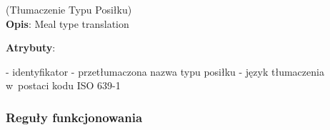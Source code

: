 \begin{enumerate}[label={\textbf{KAT/3/\protect\twodigits{\theenumi}}}, wide, labelwidth=!, labelindent=0pt, labelsep=0pt, series=reqs]
    \label{kat:MealTypeTranslation} (Tłumaczenie Typu Posiłku)\\
    \indent\textbf{Opis}: Meal type translation
    \par
    \textbf{Atrybuty}:
    \begin{itemize}[series=atr, wide, align=left, leftmargin=190pt]
        \label{kat:MealTypeTranslation:id}- identyfikator
        \label{kat:MealTypeTranslation:translation}- przetłumaczona nazwa typu posiłku
        \label{kat:MealTypeTranslation:language}- język tłumaczenia w~postaci kodu ISO 639-1
    \end{itemize}

\end{enumerate}

\subsubsection{Reguły funkcjonowania}\label{subsubsec:database:recipes:functionalRules}

